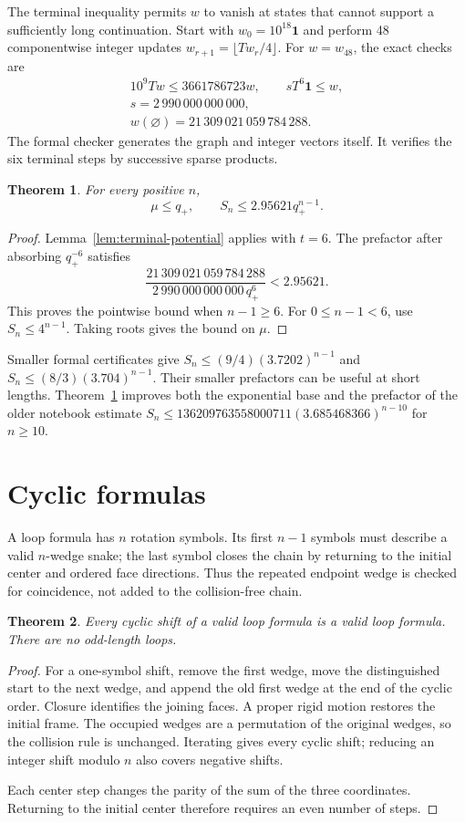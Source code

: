 \documentclass[conference]{IEEEtran}
\newtheorem{theorem}{Theorem}
\newcommand{\one}{\mathbf{1}}
\newcommand{\qplus}{q_+}
\begin{document}
The terminal inequality permits $w$ to vanish at states that cannot
support a sufficiently long continuation. Start with
$w_0=10^{18}\one$ and perform 48 componentwise integer updates
$w_{r+1}=\lfloor Tw_r/4\rfloor$. For $w=w_{48}$, the exact checks are
\[
 \begin{gathered}
 10^9Tw\leq3661786723w,\qquad sT^6\one\leq w,\\
 s=2\,990\,000\,000\,000,\\
 w(\varnothing)=21\,309\,021\,059\,784\,288.
 \end{gathered}
\]
The formal checker generates the graph and integer vectors itself.
It verifies the six terminal steps by successive sparse products.

\begin{theorem}\label{thm:formal-upper}
For every positive $n$,
\[
 \mu\leq\qplus,\qquad S_n\leq2.95621\qplus^{n-1}.
\]
\end{theorem}
\begin{proof}
Lemma~\ref{lem:terminal-potential} applies with $t=6$.
The prefactor after absorbing $\qplus^{-6}$ satisfies
\[
 \frac{21\,309\,021\,059\,784\,288}
      {2\,990\,000\,000\,000\,\qplus^6}<2.95621.
\]
This proves the pointwise bound when $n-1\geq6$.
For $0\leq n-1<6$, use $S_n\leq4^{n-1}$.
Taking roots gives the bound on $\mu$.
\end{proof}

Smaller formal certificates give
$S_n\leq(9/4)(3.7202)^{n-1}$ and
$S_n\leq(8/3)(3.704)^{n-1}$.
Their smaller prefactors can be useful at short lengths.
Theorem~\ref{thm:formal-upper} improves both the exponential base
and the prefactor of the older notebook estimate
$S_n\leq136209763558000711(3.685468366)^{n-10}$ for $n\geq10$.

\section{Cyclic formulas}

A loop formula has $n$ rotation symbols. Its first $n-1$ symbols
must describe a valid $n$-wedge snake; the last symbol closes the
chain by returning to the initial center and ordered face directions.
Thus the repeated endpoint wedge is checked for coincidence, not
added to the collision-free chain.

\begin{theorem}\label{thm:loops}
Every cyclic shift of a valid loop formula is a valid loop formula.
There are no odd-length loops.
\end{theorem}
\begin{proof}
For a one-symbol shift, remove the first wedge, move the distinguished
start to the next wedge, and append the old first wedge at the end
of the cyclic order. Closure identifies the joining faces.
A proper rigid motion restores the initial frame.
The occupied wedges are a permutation of the original wedges,
so the collision rule is unchanged. Iterating gives every cyclic
shift; reducing an integer shift modulo $n$ also covers negative
shifts.

Each center step changes the parity of the sum of the three
coordinates. Returning to the initial center therefore requires
an even number of steps.
\end{proof}
\end{document}
